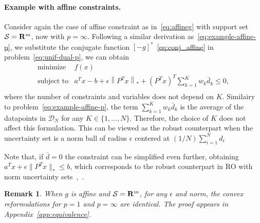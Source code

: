\documentclass[12pt]{article}
\newcommand{\citep}{\cite}
\theoremstyle{thmstyleone}%
\theoremstyle{thmstyletwo}%
\newtheorem{remark}{Remark}%
\theoremstyle{thmstylethree}%
\newcommand{\reviewChanges}{}
\begin{document}
\paragraph{Example with affine constraints.}%
\label{par:example}
Consider again the case of affine constraint as in~\eqref{eq:affineg} with support set $\mathcal{S} = {\mathbf R}^m$, now with $p=\infty$.
Following a similar derivation as~\eqref{eq:example-affine-p}, we substitute the conjugate function $[-g]^*$~\eqref{eq:conj_affine} in problem~\eqref{eq:unif-dual-p}, we can obtain
\begin{equation}
	\label{eq:example-affine-inf}
	\begin{array}{ll}
		\mbox{minimize} & f(x)\\
		\mbox{subject to} & a^Tx - b + \epsilon\left\|P^Tx \right\|_* + (P^Tx)^T\sum_{k=1}^{K} w_k \bar{d}_k \le 0,\\
	\end{array}
\end{equation}
where the number of constraints and variables does not depend on $K$.
Similairy to problem~\eqref{eq:example-affine-p}, the term $\sum_{k=1}^{K} w_k \bar{d}_k$ is the average of the datapoints in $\mathcal{D}_N$ for any $K \in \{1,\dots,N\}$. Therefore, the choice of $K$ does not affect this formulation.
\reviewChanges{This can be viewed as the robust counterpart when the uncertainty set is a norm ball of radius $\epsilon$ centered at $(1/N)\sum_{i=1}^N d_i$}

Note that, if $\bar{d} = 0$ the constraint can be simplified even further, obtaining ${a^Tx + \epsilon\|P^Tx\|_* \le b}$, which corresponds to the robust counterpart in \gls{RO} with norm uncertainty sets~\citep[Section 2.3]{robustadaptopt},~\citep[Chapter 2]{ben-tal_robust_2009}.

\begin{remark}
	When $g$ is affine and \reviewChanges{$\mathcal{S} = {\mathbf R}^m$}, for any $\epsilon$ and norm, the convex reformulations for $p = 1$ and $p = \infty$ are identical. The proof appears in Appendix~\ref{app:equivalence}.
\end{remark}
\end{document}
